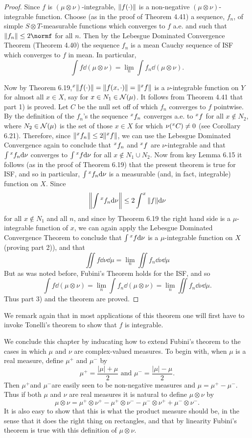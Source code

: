 \begin{proof}
Since $f$ is $(\mu\otimes\nu)$-integrable, $\norm{f(\cdot)}$ is a non-negative $(\mu\otimes\nu)$-integrable function. Choose (as in the proof of Theorem 4.41) a sequence, $f_n$, of simple $S\otimes T$-measurable functions which converges to $f$ a.e. and such that $\norm{f_n}\leq 2\normf$ for all $n$. Then by the Lebesgue Dominated Convergence Theorem (Theorem 4.40) the sequence $f_n$ is a mean Cauchy sequence of ISF which converges to $f$ in mean. In particular, $$\int f\dd(\mu\otimes\nu)=\lim_n\int f_n\dd(\mu\otimes\nu).$$

Now by Theorem 6.19,$\xsec{\norm{f(\cdot)}}{x}=\norm{f(x,\cdot)}=\norm{\xsec{f}{x}}$ is a $\nu$-integrable function on $Y$ for almost all $x\in X$, say for $x\in N_1\in\nring{\mu}$. It follows from Theorem 4.41 that part 1) is proved. Let $C$ be the null set off of which $f_n$ converges to $f$ pointwise. By the definition of the $f_n$'s the sequence $\xsec{f_n}{x}$ converges a.e. to $\xsec{f}{x}$ for all $x\notin N_2$, where $N_2\in\nring{\mu}$ is the set of those $x\in X$ for which $\nu(\xsec{C}{x})\neq 0$ (see Corollary 6.21). Therefore, since $\norm{\xsec{f_n}{x}}\leq2\norm{\xsec{f}{x}}$, we can use the Lebesgue Dominated Convergence again to conclude that $\xsec{f_n}{x}$ and $\xsec{f}{x}$ are $\nu$-integrable and that $\int\xsec{f_n}{x}\dd\nu$ converges to $\int\xsec{f}{x}\dd\nu$ for all $x\notin N_1\cup N_2$. Now from key Lemma 6.15 it follows (as in the proof of Theorem 6.19) that the present theorem is true for ISF, and so in particular, $\int\xsec{f_n}{x}\dd\nu$ is a measurable (and, in fact, integrable) function on $X$. Since $$\norm{\int\xsec{f_n}{x}\dd\nu}\leq2\int^x\norm{f}\dd\nu$$ for all $x\notin N_1$ and all $n$, and since by Theorem 6.19 the right hand side is a $\mu$-integrable function of $x$, we can again apply the Lebesgue Dominated Convergence Theorem to conclude that $\int\xsec{f}{x}\dd\nu$ is a $\mu$-integrable function on $X$ (proving part 2)), and that $$\iint f\dd\nu\dd\mu=\lim_n\iint f_n\dd\nu\dd\mu$$ But as was noted before, Fubini's Theorem holds for the ISF, and so $$\int f\dd(\mu\otimes\nu)=\lim_n\int f_n\dd(\mu\otimes\nu)=\lim_n\iint f_n\dd\nu\dd\mu.$$ Thus part 3) and the theorem are proved.
\end{proof}

We remark again that in most applications of this theorem one will first have to invoke Tonelli's theorem to show that $f$ is integrable.

We conclude this chapter by inducating how to extend Fubini's theorem to the cases in which $\mu$ and $\nu$ are complex-valued measures. To begin with, when $\mu$ is a real measure, define $\mu^+$ and $\mu^-$ by $$\mu^+=\frac{|\mu|+\mu}2\text{ and }\mu^-=\frac{|\mu|-\mu}2.$$ Then $\mu^+$and $\mu^-$are easily seen to be non-negative measures and $\mu=\mu^+-\mu^-$. Thus if both $\mu$ and $\nu$ are real measures it is natural to define $\mu\otimes\nu$ by $$\mu\otimes\nu=\mu^+\otimes\nu^+-\mu^+\otimes\nu^--\mu^-\otimes\nu^++\mu^-\otimes\nu^-.$$ It is also easy to show that this is what the product measure should be, in the sense that it does the right thing on rectangles, and that by linearity Fubini's theorem is true with this definition of $\mu\otimes\nu$.

